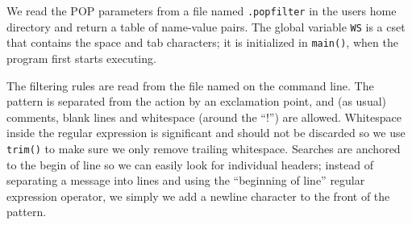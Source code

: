 
We read the POP parameters from a file named \texttt{.popfilter} in the
user{\textquotesingle}s home directory and return a table of name-value
pairs. The global variable \texttt{WS} is a cset that contains the
space and tab characters; it is initialized in \texttt{main()}, when
the program first starts executing.


The filtering rules are read from the file named on the command line.
The pattern is separated from the action by an exclamation point, and
(as usual) comments, blank lines and whitespace (around the
{\textquotedblleft}!{\textquotedblright}) are allowed. Whitespace
inside the regular expression is significant and should not be
discarded so we use \texttt{trim()} to make sure we only remove
trailing whitespace. Searches are anchored to the begin of line so we
can easily look for individual headers; instead of separating a message
into lines and using the {\textquotedblleft}beginning of
line{\textquotedblright} regular expression operator, we simply we add
a newline character to the front of the pattern.

